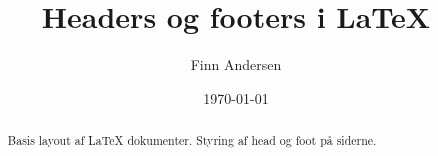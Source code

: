\documentclass{article}
\title{Headers og footers i \LaTeX{}}
\author{Finn Andersen}
\date{\today}
\begin{document}
\maketitle
\thispagestyle{empty} 

\begin{abstract}
Basis layout af \LaTeX{} dokumenter. Styring af head og foot på siderne.
\end{abstract}

\renewcommand{\sectionmark}[1]{\markboth{Afsnit\ \thesection. \ #1}{}}
\renewcommand{\subsectionmark}[1]{\markright{#1}}

\renewcommand{\headrulewidth}{0.4pt} %
\renewcommand{\footrulewidth}{0.4pt} %

\renewcommand{\headwidth}{1.0\textwidth}
\setlength\headheight{12pt}%
\setlength\headsep{35pt}%
\setlength\footskip{40pt}%

\renewcommand{\headrule}{{\color{red}%
\hrule width\headwidth height\headrulewidth \vskip-\headrulewidth}}

\renewcommand{\footrule}{{\color{blue}
\hrule width\headwidth height\footrulewidth\vskip\footruleskip}}

\lhead{\leftmark}
\lfoot{\rightmark}
\end{document}

